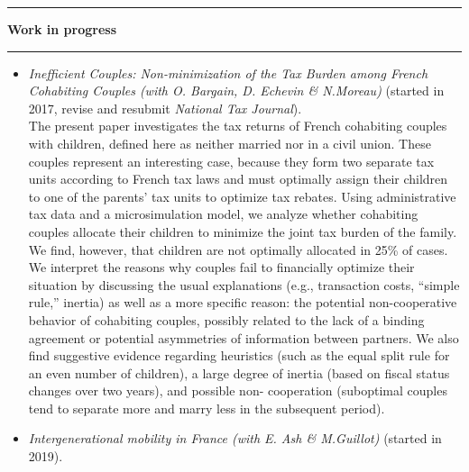 \documentclass[a4paper,11pt]{article} %
\newcommand{\titre}[1]{%
	\begin{center}
	\rule{\textwidth}{1pt}
	\par\vspace{0.1cm}
        \textbf{\large #1}
	\par\rule{\textwidth}{1pt}
	\end{center}
	}
\begin{document}
\titre{Work in progress}
\begin{itemize}



\item {\emph{Inefficient Couples: Non-minimization of the Tax Burden  among French Cohabiting Couples (with O. Bargain, D. Echevin \& N.Moreau)}} (started in 2017, revise and resubmit \emph{National Tax Journal}).\\ The present paper investigates the tax returns of French cohabiting couples with children, defined
here as neither married nor in a civil union. These couples represent an interesting case, because
they form two separate tax units according to French tax laws and must optimally assign their
children to one of the parents’ tax units to optimize tax rebates. Using administrative tax data and a
microsimulation model, we analyze whether cohabiting couples allocate their children to minimize
the joint tax burden of the family. We find, however, that children are not optimally allocated in 25\%
of cases. We interpret the reasons why couples fail to financially optimize their situation by
discussing the usual explanations (e.g., transaction costs, “simple rule,” inertia) as well as a more
specific reason: the potential non-cooperative behavior of cohabiting couples, possibly related to the
lack of a binding agreement or potential asymmetries of information between partners. We also find
suggestive evidence regarding heuristics (such as the equal split rule for an even number of children),
a large degree of inertia (based on fiscal status changes over two years), and possible non-
cooperation (suboptimal couples tend to separate more and marry less in the subsequent period).




\item {\emph{Intergenerational mobility in France (with E. Ash \& M.Guillot)}} (started in 2019).\\ 



\end{itemize}
\end{document}
